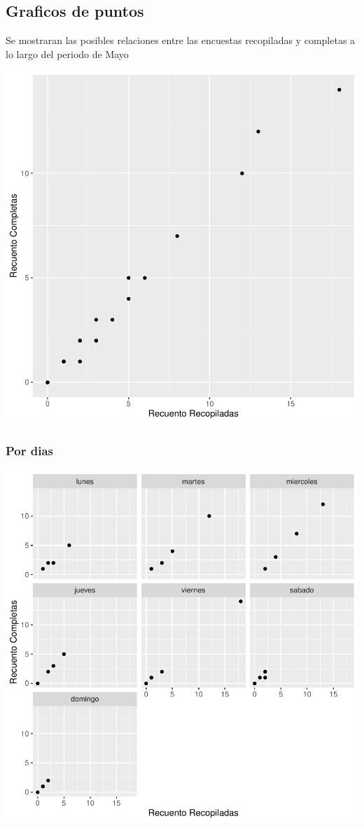 \documentclass{article}
\begin{document}
\subsection{Graficos de puntos}
Se mostraran las posibles relaciones entre las encuestas recopiladas y completas a lo largo del periodo de Mayo

\includegraphics{seguimento2-086}


\subsubsection{Por dias}

\includegraphics{seguimento2-087}
\end{document}
